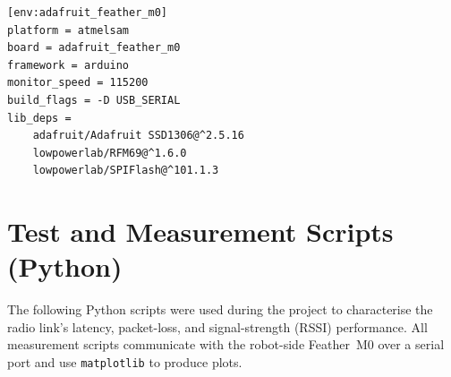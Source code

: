 \begin{lstlisting}[style=appendix-ini, caption={Robot --- platformio.ini}, label={lst:robot-pio}]
[env:adafruit_feather_m0]
platform = atmelsam
board = adafruit_feather_m0
framework = arduino
monitor_speed = 115200
build_flags = -D USB_SERIAL
lib_deps = 
	adafruit/Adafruit SSD1306@^2.5.16
	lowpowerlab/RFM69@^1.6.0
	lowpowerlab/SPIFlash@^101.1.3
\end{lstlisting}

\section{Test and Measurement Scripts (Python)}

The following Python scripts were used during the project to characterise
the radio link's latency, packet-loss, and signal-strength (RSSI)
performance.  All measurement scripts communicate with the robot-side
Feather~M0 over a serial port and use \texttt{matplotlib} to produce plots.


